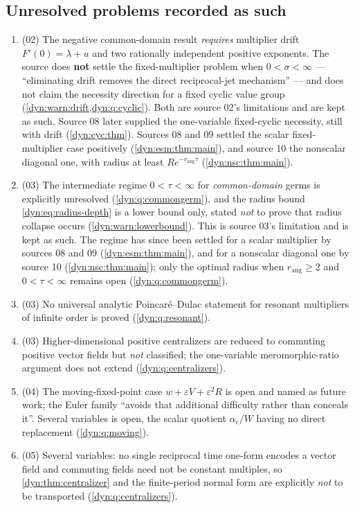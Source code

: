 \documentclass[11pt,letterpaper]{article}
\theoremstyle{definition}
\theoremstyle{remark}
\newcommand{\eps}{\varepsilon}
\newcommand{\rang}{r_{\mathrm{ang}}}
\numberwithin{equation}{section}
\begin{document}
\subsection{Unresolved problems recorded as such}
\begin{enumerate}[label=\textbf{N\arabic*.},leftmargin=3.2em,start=57]
\item (02) The negative common-domain result \emph{requires} multiplier
drift $F'(0)=\lambda+u$ and two rationally independent positive exponents.
The source does \textbf{not} settle the fixed-multiplier problem when
$0<\sigma<\infty$ --- ``eliminating drift removes the direct reciprocal-jet
mechanism'' --- and does not claim the necessity direction for a fixed
cyclic value group (\cref{dyn:warn:drift,dyn:q:cyclic}). Both are source
02's limitations and are kept as such. Source 08 later supplied the
one-variable fixed-cyclic necessity, still with drift (\cref{dyn:cyc:thm}).
Sources 08 and 09 settled the scalar fixed-multiplier case positively
(\cref{dyn:esm:thm:main}), and source 10 the nonscalar diagonal one, with
radius at least $Re^{-\rang\tau}$ (\cref{dyn:nsc:thm:main}).
\item (03) The intermediate regime $0<\tau<\infty$ for
\emph{common-domain} germs is explicitly unresolved
(\cref{dyn:q:commongerm}), and the radius bound
\eqref{dyn:eq:radius-depth} is a lower bound only, stated \emph{not} to
prove that radius collapse occurs (\cref{dyn:warn:lowerbound}). This is
source 03's limitation and is kept as such. The regime has since been
settled for a scalar multiplier by sources 08 and 09
(\cref{dyn:esm:thm:main}), and for a nonscalar diagonal one by source 10
(\cref{dyn:nsc:thm:main}); only the optimal radius when $\rang\ge2$ and $0<\tau<\infty$ remains
open (\cref{dyn:q:commongerm}).
\item (03) No universal analytic Poincar\'e--Dulac statement for resonant
multipliers of infinite order is proved
(\cref{dyn:q:resonant}).
\item (03) Higher-dimensional positive centralizers are reduced to
commuting positive vector fields but \emph{not} classified; the
one-variable meromorphic-ratio argument does not extend
(\cref{dyn:q:centralizers}).
\item (04) The moving-fixed-point case $w+\eps V+\eps^{2}R$ is open and
named as future work; the Euler family ``avoids that additional difficulty
rather than conceals it''. Several variables is open, the scalar quotient
$\alpha_{\mathrm c}/W$ having no direct replacement
(\cref{dyn:q:moving}).
\item (05) Several variables: no single reciprocal time one-form encodes a
vector field and commuting fields need not be constant multiples, so
\cref{dyn:thm:centralizer} and the finite-period normal form are explicitly
\emph{not} to be transported (\cref{dyn:q:centralizers}).
\end{enumerate}
\end{document}
